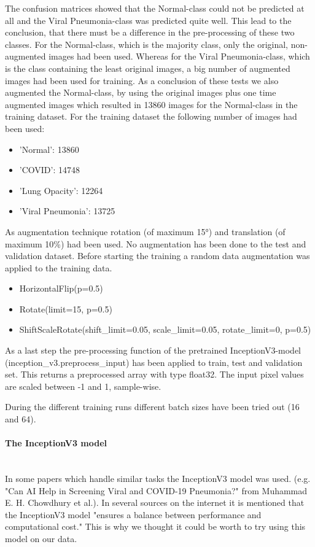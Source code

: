 \documentclass{article}
\begin{document}
The confusion matrices showed that the Normal-class could not be predicted at all and the Viral Pneumonia-class was predicted quite well. This lead to the conclusion, that there must be a difference in the pre-processing of these two classes. For the Normal-class, which is the majority class, only the original, non-augmented images had been used. Whereas for the Viral Pneumonia-class, which is the class containing the least original images, a big number of augmented images had been used for training. 
As a conclusion of these tests we also augmented the Normal-class, by using the original images plus one time augmented images which resulted in 13860 images for the Normal-class in the training dataset. For the training dataset the following number of images had been used: 
\begin{itemize}
\item 'Normal':  13860
\item 'COVID':  14748
\item 'Lung Opacity': 12264 
\item 'Viral Pneumonia':  13725
\end{itemize}
As augmentation technique rotation (of maximum 15°) and translation (of maximum 10\%) had been used. 
No augmentation has been done to the test and validation dataset. 
Before starting the training a random data augmentation was applied to the training data.
\begin{itemize}
\item HorizontalFlip(p=0.5)
\item Rotate(limit=15, p=0.5)
\item ShiftScaleRotate(shift\_limit=0.05, scale\_limit=0.05, rotate\_limit=0, p=0.5) 
\end{itemize}

As a last step the pre-processing function of the pretrained InceptionV3-model (inception\_v3.preprocess\_input) has been applied to train, test and validation set. This returns a preprocessed array with type float32. The input pixel values are scaled between -1 and 1, sample-wise. 

During the different training runs different batch sizes have been tried out (16 and 64). 

\paragraph{The InceptionV3 model}\mbox{}\\
In some papers which handle similar tasks the InceptionV3 model was used. (e.g. "Can AI Help in Screening Viral and COVID-19 Pneumonia?" from Muhammad E. H. Chowdhury et al.). In several sources on the internet it is mentioned that the InceptionV3 model "ensures a balance between performance and computational cost." This is why we thought it could be worth to try using this model on our data. 
\end{document}
